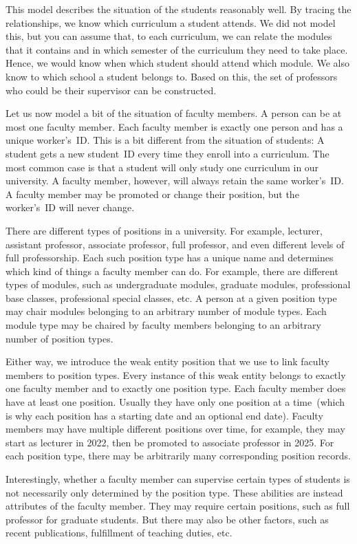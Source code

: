 This model describes the situation of the students reasonably well.
By tracing the relationships, we know which curriculum a student attends.
We did not model this, but you can assume that, to each curriculum, we can relate the modules that it contains and in which semester of the curriculum they need to take place.
Hence, we would know when which student should attend which module.
We also know to which school a student belongs to.
Based on this, the set of professors who could be their supervisor can be constructed.

Let us now model a bit of the situation of faculty members.
A person can be at most one faculty member.
Each faculty member is exactly one person and has a unique worker's~ID.
This is a bit different from the situation of students:
A student gets a new student~ID every time they enroll into a curriculum.
The most common case is that a student will only study one curriculum in our university.
A faculty member, however, will always retain the same worker's~ID.
A faculty member may be promoted or change their position, but the worker's~ID will never change.

There are different types of positions in a university.
For example, lecturer, assistant professor, associate professor, full professor, and even different levels of full professorship.
Each such position type has a unique name and determines which kind of things a faculty member can do.
For example, there are different types of modules, such as undergraduate modules, graduate modules, professional base classes, professional special classes, etc.
A person at a given position type may chair modules belonging to an arbitrary number of module types.
Each module type may be chaired by faculty members belonging to an arbitrary number of position types.

Either way, we introduce the weak entity position that we use to link faculty members to position types.
Every instance of this weak entity belongs to exactly one faculty member and to exactly one position type.
Each faculty member does have at least one position.
Usually they have only one position at a time~(which is why each position has a starting date and an optional end date).
Faculty members may have multiple different positions over time, for example, they may start as lecturer in 2022, then be promoted to associate professor in 2025.
For each position type, there may be arbitrarily many corresponding position records.

Interestingly, whether a faculty member can supervise certain types of students is not necessarily only determined by the position type.
These abilities are instead attributes of the faculty member.
They may require certain positions, such as full professor for graduate students.
But there may also be other factors, such as recent publications, fulfillment of teaching duties, etc.

